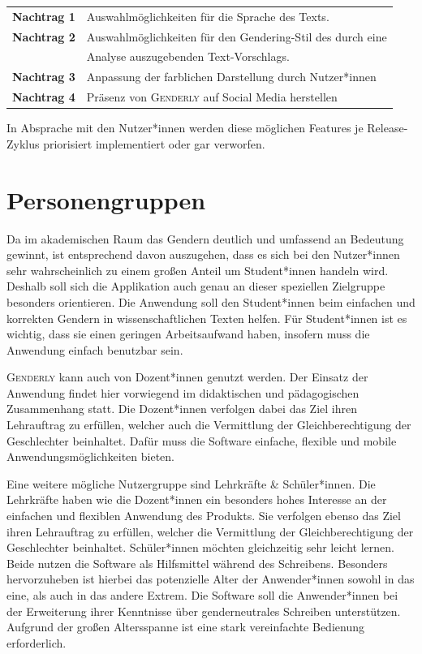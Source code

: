 \documentclass[paper=a4, parskip=half]{scrreprt}
\newcommand{\Genderly}{\textsc{Genderly }}
\begin{document}
\begin{table}[!htb]
\begin{tabular}{ll}
\textbf{Nachtrag 1} & Auswahlmöglichkeiten für die Sprache des Texts. \vspace{0.1cm} \\
\textbf{Nachtrag 2} & Auswahlmöglichkeiten für den Gendering-Stil des durch eine \\
 & Analyse auszugebenden Text-Vorschlags. \vspace{0.1cm} \\
\textbf{Nachtrag 3} & Anpassung der farblichen Darstellung durch Nutzer*innen \vspace{0.1cm} \\
\textbf{Nachtrag 4} & Präsenz von \Genderly auf Social Media herstellen \vspace{0.1cm} \\
\end{tabular}
\end{table}

In Absprache mit den Nutzer*innen werden diese möglichen Features je Release-Zyklus priorisiert implementiert oder gar verworfen.

\section{Personengruppen}
Da im akademischen Raum das Gendern deutlich und umfassend an Bedeutung gewinnt, ist entsprechend davon auszugehen, dass es sich bei den Nutzer*innen sehr wahrscheinlich zu einem großen Anteil um Student*innen handeln wird. Deshalb soll sich die Applikation auch genau an dieser speziellen Zielgruppe besonders orientieren. Die Anwendung soll den Student*innen beim einfachen und korrekten Gendern in wissenschaftlichen Texten helfen. Für Student*innen ist es wichtig, dass sie einen geringen Arbeitsaufwand haben, insofern muss die Anwendung einfach benutzbar sein.

\Genderly kann auch von Dozent*innen genutzt werden. Der Einsatz der Anwendung findet hier vorwiegend im didaktischen und pädagogischen Zusammenhang statt. Die Dozent*innen verfolgen dabei das Ziel ihren Lehrauftrag zu erfüllen, welcher auch die Vermittlung der Gleichberechtigung der Geschlechter beinhaltet. Dafür muss die Software einfache, flexible und mobile Anwendungsmöglichkeiten bieten. 

Eine weitere mögliche Nutzergruppe sind Lehrkräfte \& Schüler*innen. Die Lehrkräfte haben wie die Dozent*innen ein besonders hohes Interesse an der einfachen und flexiblen Anwendung des Produkts. Sie verfolgen ebenso das Ziel ihren Lehrauftrag zu erfüllen, welcher die Vermittlung der Gleichberechtigung der Geschlechter beinhaltet. Schüler*innen möchten gleichzeitig sehr leicht lernen. Beide nutzen die Software als Hilfsmittel während des Schreibens. Besonders hervorzuheben ist hierbei das potenzielle Alter der Anwender*innen sowohl in das eine, als auch in das andere Extrem. Die Software soll die Anwender*innen bei der Erweiterung ihrer Kenntnisse über genderneutrales Schreiben unterstützen. Aufgrund der großen Altersspanne ist eine stark vereinfachte Bedienung erforderlich.
\end{document}
